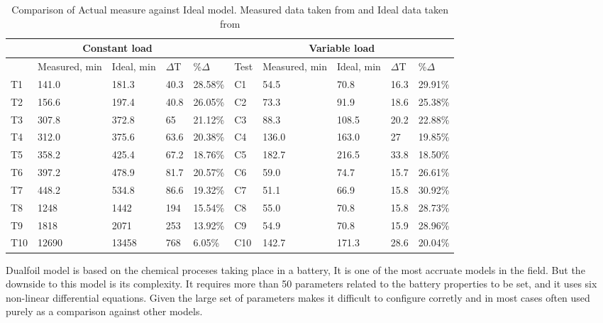 \begin{table}[]
	\centering
	\label{t-Ideal}
	\begin{tabular}{|lllll|lllll|}
		\hline
		\multicolumn{5}{|c|}{Constant load} & \multicolumn{5}{c|}{Variable load} \\ \hline
		\rowcolor[HTML]{EFEFEF} 
		\multicolumn{1}{|l|}{\cellcolor[HTML]{EFEFEF}Test} & \multicolumn{1}{l|}{\cellcolor[HTML]{EFEFEF}Measured, min} & \multicolumn{1}{l|}{\cellcolor[HTML]{EFEFEF}Ideal, min} & \multicolumn{1}{l|}{\cellcolor[HTML]{EFEFEF} $\Delta$T} & \%$\Delta$ & \multicolumn{1}{l|}{\cellcolor[HTML]{EFEFEF}Test} & \multicolumn{1}{l|}{\cellcolor[HTML]{EFEFEF}Measured, min} & \multicolumn{1}{l|}{\cellcolor[HTML]{EFEFEF}Ideal, min} & \multicolumn{1}{l|}{\cellcolor[HTML]{EFEFEF} $\Delta$T} & \%$\Delta$ \\ \hline
		T1 & 141.0 & 181.3 & 40.3 & 28.58\% & C1 & 54.5 & 70.8 & 16.3 & 29.91\% \\ \hline
		\rowcolor[HTML]{EFEFEF} 
		T2 & 156.6 & 197.4 & 40.8 & 26.05\% & C2 & 73.3 & 91.9 & 18.6 & 25.38\% \\ \hline
		T3 & 307.8 & 372.8 & 65 & 21.12\% & C3 & 88.3 & 108.5 & 20.2 & 22.88\% \\ \hline
		\rowcolor[HTML]{EFEFEF} 
		T4 & 312.0 & 375.6 & 63.6 & 20.38\% & C4 & 136.0 & 163.0 & 27 & 19.85\% \\ \hline
		T5 & 358.2 & 425.4 & 67.2 & 18.76\% & C5 & 182.7 & 216.5 & 33.8 & 18.50\% \\ \hline
		\rowcolor[HTML]{EFEFEF} 
		T6 & 397.2 & 478.9 & 81.7 & 20.57\% & C6 & 59.0 & 74.7 & 15.7 & 26.61\% \\ \hline
		T7 & 448.2 & 534.8 & 86.6 & 19.32\% & C7 & 51.1 & 66.9 & 15.8 & 30.92\% \\ \hline
		\rowcolor[HTML]{EFEFEF} 
		T8 & 1248 & 1442 & 194 & 15.54\% & C8 & 55.0 & 70.8 & 15.8 & 28.73\% \\ \hline
		T9 & 1818 & 2071 & 253 & 13.92\% & C9 & 54.9 & 70.8 & 15.9 & 28.96\% \\ \hline
		\rowcolor[HTML]{EFEFEF} 
		T10 & 12690 & 13458 & 768 & 6.05\% & C10 & 142.7 & 171.3 & 28.6 & 20.04\% \\ \hline
	\end{tabular}
	\caption{Comparison of Actual measure against Ideal model. Measured data taken from \cite{battery_lifetime_analysis} and Ideal data taken from \cite{battery_model}}
\end{table}


Dualfoil model is based on the chemical proceses taking place in a battery, It is one of the most accruate models in the field. But the downside to this model is its complexity. It requires more than 50 parameters related to the battery properties to be set, and it uses six non-linear differential equations. Given the large set of parameters makes it difficult to configure corretly and in most cases often used purely as a comparison against other models.

